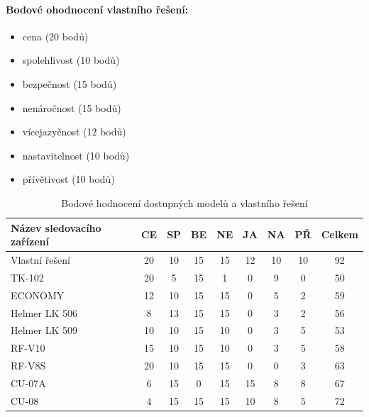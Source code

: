 \documentclass[FM,MP]{tulthesis}  %
\begin{document}
\paragraph{Bodové ohodnocení vlastního řešení:}
\begin{itemize}
\item cena (20 bodů)
\item spolehlivost (10 bodů)
\item bezpečnost (15 bodů)
\item nenáročnost (15 bodů)
\item vícejazyčnost (12 bodů)
\item nastavitelnost (10 bodů)
\item přívětivost (10 bodů)
\end{itemize}

\renewcommand{\arraystretch}{1.5}
\begin{table}[H]
\begin{center}
\begin{tabular}{| l | c | c| c | c | c | c | c | c |}
\hline
Název sledovacího zařízení & CE & SP & BE & NE & JA & NA & PŘ & Celkem\\
\hline
\hline
Vlastní řešení & 20 & 10 & 15 & 15 & 12 & 10 & 10 & 92\\
\hline
TK-102 & 20 & 5 & 15 & 1 & 0 & 9 & 0 & 50\\
\hline
ECONOMY & 12 & 10 & 15 & 15 & 0 & 5 & 2 & 59\\
\hline
Helmer LK 506 & 8 & 13 & 15 & 15 & 0 & 3 & 2 & 56\\
\hline
Helmer LK 509 & 10 & 10 & 15 & 10 & 0 & 3 & 5 & 53\\
\hline
RF-V10 & 15 & 10 & 15 & 10 & 0 & 3 & 5 & 58\\
\hline
RF-V8S & 20 & 10 & 15 & 15 & 0 & 0 & 3 & 63\\
\hline
CU-07A & 6 & 15 & 0 & 15 & 15 & 8 & 8 & 67\\
\hline
CU-08 & 4 & 15 & 15 & 15 & 10 & 8 & 5 & 72\\
\hline
\end{tabular}
\end{center}
\caption{Bodové hodnocení dostupných modelů a vlastního řešení}
\end{table}
\end{document}

